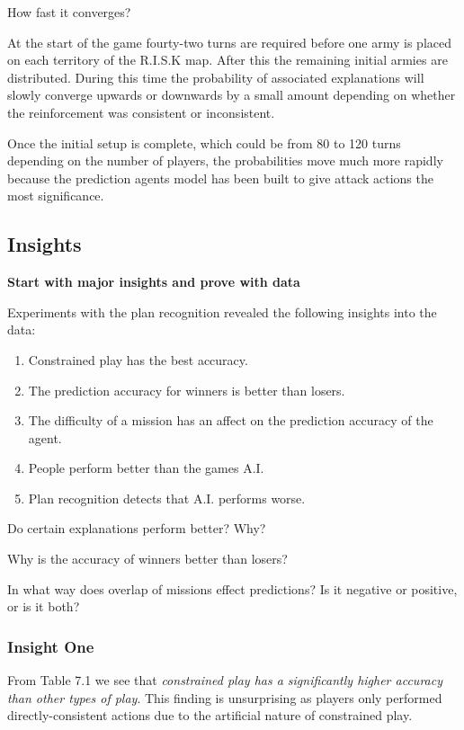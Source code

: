 \documentclass[parskip]{cs4rep}
\begin{document}
How fast it converges?

At the start of the game fourty-two turns are required before one army is placed on each territory of the R.I.S.K map. After this the remaining initial armies are distributed. During this time the probability of associated explanations will slowly converge upwards or downwards by a small amount depending on whether the reinforcement was consistent or inconsistent.

Once the initial setup is complete, which could be from 80 to 120 turns depending on the number of players, the probabilities move much more rapidly because the prediction agents model has been built to give attack actions the most significance.

\subsection{Insights}

\textbf{Start with major insights and prove with data}

Experiments with the plan recognition revealed the following insights into the data:

\begin{enumerate}
\item
Constrained play has the best accuracy. 
\item
The prediction accuracy for winners is better than losers.
\item
The difficulty of a mission has an affect on the prediction accuracy of the agent.
\item
People perform better than the games A.I.
\item
Plan recognition detects that A.I. performs worse.\newline
\end{enumerate}

Do certain explanations perform better? Why?

Why is the accuracy of winners better than losers?

In what way does overlap of missions effect predictions? Is it negative or positive, or is it both?

\subsubsection{Insight One}

From Table 7.1 we see that \textit{constrained play has a significantly higher accuracy than other types of play}. This finding is unsurprising as players only performed directly-consistent actions due to the artificial nature of constrained play. 
\end{document}
